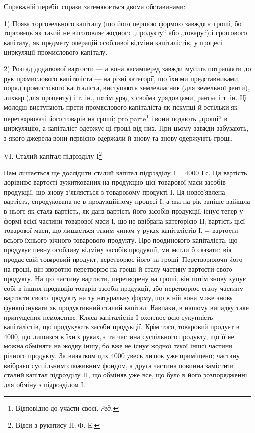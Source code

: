 Справжній перебіг справи затемнюється двома обставинами:

1) Поява торговельного капіталу (що його першою формою
завжди є гроші, бо торговець як такий не виготовляє жодного
„продукту“ або „товару“) і грошового капіталу, як предмету
операцій особливої відміни капіталістів, у процесі циркуляції промислового
капіталу.

2) Розпад додаткової вартости — а вона насамперед завжди мусить
потрапляти до рук промислового капіталіста — на різні категорії, що їхніми
представниками, поряд промислового капіталіста, виступають землевласник
(для земельної ренти), лихвар (для проценту) і т. ін., потім уряд з своїми
урядовцями, рантьє і т. ін. Ці молодці виступають проти промислового
капіталіста як покупці й остільки як перетворювачі його товарів на гроші;
pro parte\footnote*{
Відповідно до участи своєї. \emph{Ред.}
} і вони подають „гроші“ в циркуляцію, а капіталіст одержує
ці гроші від них. При цьому завжди забувають, з якого джерела вони
первісно одержали й знову та знову одержують гроші.

VI. Сталий капітал підрозділу I\footnote{
Відси з рукопису II. Ф. Е.
}

Нам лишається ще дослідити сталий капітал підрозділу І = 4000 І с.
Ця вартість дорівнює вартості зужиткованих на продукцію цієї товарової
маси засобів продукції, що знову з’являється в товаровому продукті І.
Ця новоз’явлена вартість, спродукована не в продукційному процесі І, а
яка на рік раніше ввійшла в нього як стала вартість, як дана вартість
його засобів продукції, існує тепер у формі всієї частини товарової маси І,
що не ввібрана категорією II; вартість цієї товарової маси, що лишається
таким чином у руках капіталістів І, =  вартости всього їхнього річного
товарового продукту. Про поодинокого капіталіста, що продукує певну
особливу відміну засобів продукції, ми могли б сказати: він продає свій
товаровий продукт, перетворює його на гроші. Перетворюючи його на
гроші, він зворотно перетворює на гроші й сталу частину вартости свого
продукту. На цю частину вартости, перетворену на гроші, він потім знову
купує собі в інших продавців товарів засоби продукції, або перетворює
сталу частину вартости свого продукту на ту натуральну форму, що
в ній вона може знову функціонувати як продуктивний сталий капітал.
Навпаки, в нашому випадку таке припущення неможливе. Кляса капіталістів
І охоплює всю сукупність капіталістів, що продукують засоби продукції.
Крім того, товаровий продукт в 4000, що лишився в їхніх руках,
є та частина суспільного продукту, що її не можна обміняти на жодну
іншу, бо вже не існує жодної такої іншої частини річного продукту. За
винятком цих 4000 увесь лишок уже приміщено; частину ввібрано суспільним
споживним фондом, а друга частина повинна замістити сталий
капітал підрозділу II, що обміняв уже все, що було в його розпорядженні
для обміну з підрозділом І.
\parbreak{}  %
